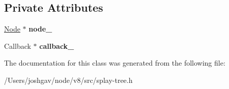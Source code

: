 \subsection*{Private Attributes}
\begin{DoxyCompactItemize}
\item 
\hyperlink{classv8_1_1internal_1_1_splay_tree_1_1_node}{Node} $\ast$ {\bfseries node\+\_\+}\hypertarget{classv8_1_1internal_1_1_splay_tree_1_1_b_a_s_e___e_m_b_e_d_d_e_d_a14931d5742bd909672b61e000c6dc350}{}\label{classv8_1_1internal_1_1_splay_tree_1_1_b_a_s_e___e_m_b_e_d_d_e_d_a14931d5742bd909672b61e000c6dc350}

\item 
Callback $\ast$ {\bfseries callback\+\_\+}\hypertarget{classv8_1_1internal_1_1_splay_tree_1_1_b_a_s_e___e_m_b_e_d_d_e_d_acd5c853b9043615f142acb0f67168ed7}{}\label{classv8_1_1internal_1_1_splay_tree_1_1_b_a_s_e___e_m_b_e_d_d_e_d_acd5c853b9043615f142acb0f67168ed7}

\end{DoxyCompactItemize}


The documentation for this class was generated from the following file\+:\begin{DoxyCompactItemize}
\item 
/\+Users/joshgav/node/v8/src/splay-\/tree.\+h\end{DoxyCompactItemize}
